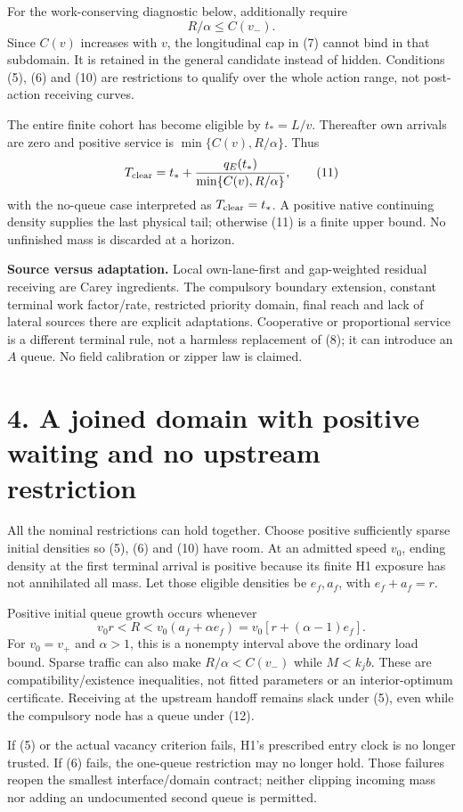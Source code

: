 \documentclass[11pt,a4paper]{article}
\begin{document}
For the work-conserving diagnostic below, additionally require
\[
 R/\alpha\leq C(v_-).
 \tag{10}
\]
Since $C(v)$ increases with $v$, the longitudinal cap in (7) cannot bind in
that subdomain. It is retained in the general candidate instead of hidden.
Conditions (5), (6) and (10) are restrictions to qualify over the whole action
range, not post-action receiving curves.

The entire finite cohort has become eligible by $t_*=L/v$. Thereafter own
arrivals are zero and positive service is $\min\{C(v),R/\alpha\}$. Thus
\[
 T_{\rm clear}=t_*+
 \frac{q_E(t_*)}{\min\{C(v),R/\alpha\}},
 \tag{11}
\]
with the no-queue case interpreted as $T_{\rm clear}=t_*$. A positive native
continuing density supplies the last physical tail; otherwise (11) is a
finite upper bound. No unfinished mass is discarded at a horizon.

\textbf{Source versus adaptation.} Local own-lane-first and gap-weighted
residual receiving are Carey ingredients. The compulsory boundary extension,
constant terminal work factor/rate, restricted priority domain, final reach
and lack of lateral sources there are explicit adaptations. Cooperative or
proportional service is a different terminal rule, not a harmless replacement
of (8); it can introduce an $A$ queue. No field calibration or zipper law is
claimed.

\section*{4. A joined domain with positive waiting and no upstream restriction}
All the nominal restrictions can hold together. Choose positive sufficiently
sparse initial densities so (5), (6) and (10) have room. At an admitted speed
$v_0$, ending density at the first terminal arrival is positive because its
finite H1 exposure has not annihilated all mass. Let those eligible densities
be $e_f,a_f$, with $e_f+a_f=r$.

Positive initial queue growth occurs whenever
\[
 v_0r<R<v_0(a_f+\alpha e_f)
       =v_0[r+(\alpha-1)e_f].
 \tag{12}
\]
For $v_0=v_+$ and $\alpha>1$, this is a nonempty interval above the ordinary
load bound. Sparse traffic can also make $R/\alpha<C(v_-)$ while $M<k_jb$.
These are compatibility/existence inequalities, not fitted parameters or
an interior-optimum certificate. Receiving at the upstream handoff remains
slack under (5), even while the compulsory node has a queue under (12).

If (5) or the actual vacancy criterion fails, H1's prescribed entry clock
is no longer trusted. If (6) fails, the one-queue restriction may no longer
hold. Those failures reopen the smallest interface/domain contract; neither
clipping incoming mass nor adding an undocumented second queue is permitted.
\end{document}

